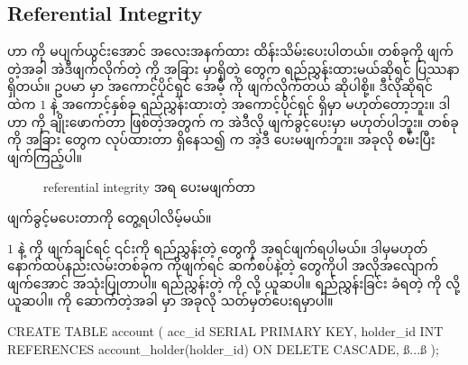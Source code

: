 \subsection*{Referential Integrity}
 ဟာ  ကို မပျက်ယွင်းအောင် အလေးအနက်ထား  ထိန်းသိမ်းပေးပါတယ်။  တစ်ခုကို ဖျက်တဲ့အခါ အဲဒီဖျက်လိုက်တဲ့  ကို အခြား  မှာရှိတဲ့  တွေက ရည်ညွှန်းထားမယ်ဆိုရင် ပြဿနာရှိတယ်။ ဥပမာ   မှာ အကောင့်ပိုင်ရှင် အေမီ့  ကို ဖျက်လိုက်တယ် ဆိုပါစို့။ ဒီလိုဆိုရင်   ထဲက  $1$ နဲ့ အကောင့်နှစ်ခု ရည်ညွှန်းထားတဲ့ အကောင့်ပိုင်ရှင်  ရှိမှာ မဟုတ်တော့ဘူး။ ဒါဟာ  ကို ချိုးဖောက်တာ ဖြစ်တဲ့အတွက်  က အဲဒီလို ဖျက်ခွင့်ပေးမှာ မဟုတ်ပါဘူး။  တစ်ခုကို အခြား  တွေက  လုပ်ထားတာ ရှိနေသ၍  က အဲ့ဒီ  ပေးမဖျက်ဘူး။ အခုလို စမ်းပြီး ဖျက်ကြည့်ပါ။ 
%
\begin{figure}[tbh!]
\caption{referential integrity အရ ပေးမဖျက်တာ} 
\label{fig:ref_integrity}
\end{figure}%
ဖျက်ခွင့်မပေးတာကို တွေ့ရပါလိမ့်မယ်။

 $1$ နဲ့  ကို ဖျက်ချင်ရင် ၎င်းကို ရည်ညွှန်းတဲ့  တွေကို အရင်ဖျက်ရပါမယ်။ ဒါမှမဟုတ် နောက်ထပ်နည်းလမ်းတစ်ခုက  ကိုဖျက်ရင် ဆက်စပ်နဲ့တဲ့  တွေကိုပါ အလိုအလျောက် ဖျက်အောင်   အသုံးပြုတာပါ။ ရည်ညွှန်းတဲ့  ကို  လို့ ယူဆပါ။ ရည်ညွှန်းခြင်း ခံရတဲ့  ကို  လို့ ယူဆပါ။  ကို  ဆောက်တဲ့အခါ   မှာ အခုလို သတ်မှတ်ပေးရမှာပါ။
%
\begin{sql}
CREATE TABLE account (
    acc_id SERIAL PRIMARY KEY,
    holder_id INT REFERENCES account_holder(holder_id) ON DELETE CASCADE,
    ß$\ldots$ß
);
\end{sql}
%

